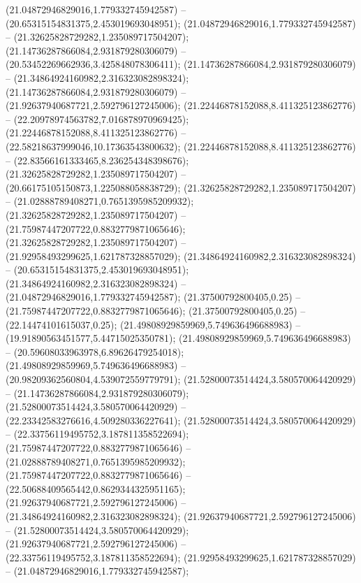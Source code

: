  (21.04872946829016,1.779332745942587) -- (20.65315154831375,2.453019693048951);
 (21.04872946829016,1.779332745942587) -- (21.32625828729282,1.235089717504207);
 (21.14736287866084,2.931879280306079) -- (20.53452269662936,3.425848078306411);
 (21.14736287866084,2.931879280306079) -- (21.34864924160982,2.316323082898324);
 (21.14736287866084,2.931879280306079) -- (21.92637940687721,2.592796127245006);
 (21.22446878152088,8.411325123862776) -- (22.20978974563782,7.016878970969425);
 (21.22446878152088,8.411325123862776) -- (22.58218637999046,10.17363543800632);
 (21.22446878152088,8.411325123862776) -- (22.83566161333465,8.236254348398676);
 (21.32625828729282,1.235089717504207) -- (20.66175105150873,1.225088058838729);
 (21.32625828729282,1.235089717504207) -- (21.02888789408271,0.7651395985209932);
 (21.32625828729282,1.235089717504207) -- (21.75987447207722,0.8832779871065646);
 (21.32625828729282,1.235089717504207) -- (21.92958493299625,1.621787328857029);
 (21.34864924160982,2.316323082898324) -- (20.65315154831375,2.453019693048951);
 (21.34864924160982,2.316323082898324) -- (21.04872946829016,1.779332745942587);
 (21.37500792800405,0.25) -- (21.75987447207722,0.8832779871065646);
 (21.37500792800405,0.25) -- (22.14474101615037,0.25);
 (21.49808929859969,5.749636496688983) -- (19.91890563451577,5.44715025350781);
 (21.49808929859969,5.749636496688983) -- (20.59608033963978,6.89626479254018);
 (21.49808929859969,5.749636496688983) -- (20.98209362560804,4.539072559779791);
 (21.52800073514424,3.580570064420929) -- (21.14736287866084,2.931879280306079);
 (21.52800073514424,3.580570064420929) -- (22.23342583276616,4.509280336227641);
 (21.52800073514424,3.580570064420929) -- (22.33756119495752,3.187811358522694);
 (21.75987447207722,0.8832779871065646) -- (21.02888789408271,0.7651395985209932);
 (21.75987447207722,0.8832779871065646) -- (22.50688409565442,0.8629344325951165);
 (21.92637940687721,2.592796127245006) -- (21.34864924160982,2.316323082898324);
 (21.92637940687721,2.592796127245006) -- (21.52800073514424,3.580570064420929);
 (21.92637940687721,2.592796127245006) -- (22.33756119495752,3.187811358522694);
 (21.92958493299625,1.621787328857029) -- (21.04872946829016,1.779332745942587);
